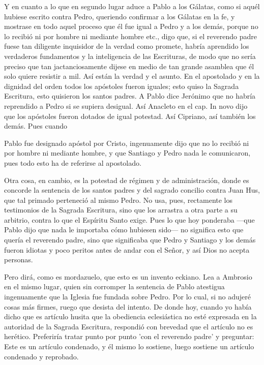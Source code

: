 Y en cuanto a lo que en segundo lugar aduce a Pablo a los Gálatas, como si aquél hubiese escrito contra Pedro, queriendo confirmar a los Gálatas en la fe, y mostrase en todo aquel proceso que él fue igual a Pedro y a los demás, porque no lo recibió ni por hombre ni mediante hombre etc., digo que, si el reverendo padre fuese tan diligente inquisidor de la verdad como promete, habría aprendido los verdaderos fundamentos y la inteligencia de las Escrituras, de modo que no sería preciso que tan jactanciosamente dijese en medio de tan grande asamblea que él solo quiere resistir a mil. Así están la verdad y el asunto. En el apostolado y en la dignidad del orden todos los apóstoles fueron iguales; esto quiso la Sagrada Escritura, esto quisieron los santos padres. A Pablo dice Jerónimo que no habría reprendido a Pedro si se supiera desigual. Así Anacleto en el cap. In novo dijo que los apóstoles fueron dotados de igual potestad. Así Cipriano, así también los demás. Pues cuando

Pablo fue designado apóstol por Cristo, ingenuamente dijo que no lo recibió ni por hombre ni mediante hombre, y que Santiago y Pedro nada le comunicaron, pues todo esto ha de referirse al apostolado.

Otra cosa, en cambio, es la potestad de régimen y de administración, donde es concorde la sentencia de los santos padres y del sagrado concilio contra Juan Hus, que tal primado perteneció al mismo Pedro. No usa, pues, rectamente los testimonios de la Sagrada Escritura, sino que los arrastra a otra parte a su arbitrio, contra lo que el Espíritu Santo exige. Pues lo que hoy ponderaba —que Pablo dijo que nada le importaba cómo hubiesen sido— no significa esto que quería el reverendo padre, sino que significaba que Pedro y Santiago y los demás fueron idiotas y poco peritos antes de andar con el Señor, y así Dios no acepta personas.

Pero dirá, como es mordazuelo, que esto es un invento eckiano. Lea a Ambrosio en el mismo lugar, quien sin corromper la sentencia de Pablo atestigua ingenuamente que la Iglesia fue fundada sobre Pedro. Por lo cual, si no adujeré cosas más firmes, ruego que desista del intento. De donde hoy, cuando yo había dicho que es artículo husita que la obediencia eclesiástica no esté expresada en la autoridad de la Sagrada Escritura, respondió con brevedad que el artículo no es herético. Preferiría tratar punto por punto 'con el reverendo padre' y preguntar: Este es un artículo condenado, y él mismo lo sostiene, luego sostiene un artículo condenado y reprobado.

